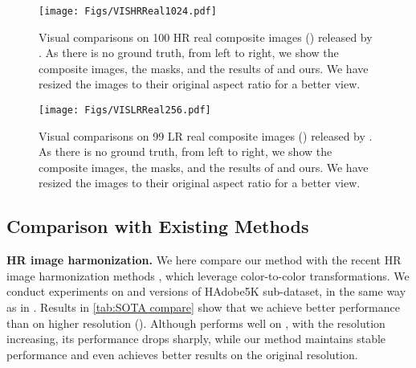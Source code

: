 \documentclass[10pt,journal,twocolumn,twoside]{IEEEtran}
\begin{document}
\begin{figure}[t]
  \centering
   \texttt{[image: Figs/VISHRReal1024.pdf]}
   \caption{Visual comparisons on 100 HR real composite images () released by \cite{cong2022high}. As there is no ground truth, from left to right, we show the composite images, the masks, and the results of \cite{cong2022high} and ours. We have resized the images to their original aspect ratio for a better view.}
   \label{fig:VISHRReal1024}
\end{figure}



\begin{figure}[t]
  \centering
   \texttt{[image: Figs/VISLRReal256.pdf]}
   \caption{Visual comparisons on 99 LR real composite images () released by \cite{tsai2017deep}. As there is no ground truth, from left to right, we show the composite images, the masks, and the results of \cite{cong2020dovenet, ling2021region, guo2021intrinsic, guo2021image} and ours. We have resized the images to their original aspect ratio for a better view.}
   \label{fig:VISLRReal256}
\end{figure}


\subsection{Comparison with Existing Methods}
\label{subsec:sota}


\textbf{HR image harmonization.} We here compare our method with the recent HR image harmonization methods \cite{cong2022high, xue2022dccf, ke2022harmonizer, liang2022spatial}, which leverage color-to-color transformations. We conduct experiments on  and  versions of HAdobe5K sub-dataset, in the same way as in \cite{cong2022high}. Results in \cref{tab:SOTA compare} show that we achieve better performance than \cite{cong2022high} on higher resolution (). Although \cite{cong2022high} performs well on , with the resolution increasing, its performance drops sharply, while our method maintains stable performance and even achieves better results on the original resolution.
\end{document}
